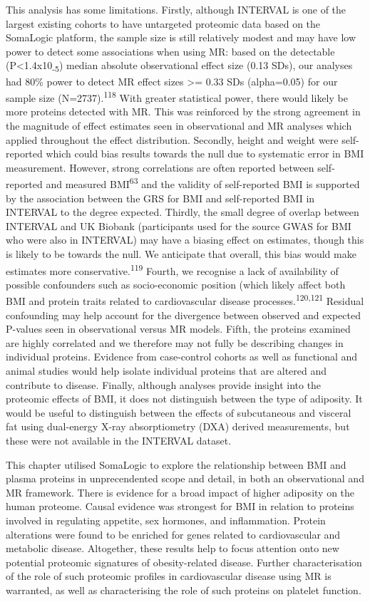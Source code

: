 \documentclass[11pt,twoside]{bristolthesis}
\begin{document}
This analysis has some limitations. Firstly, although INTERVAL is one of the largest existing cohorts to have untargeted proteomic data based on the SomaLogic platform, the sample size is still relatively modest and may have low power to detect some associations when using MR: based on the detectable (P\textless1.4x10\textsubscript{-5}) median absolute observational effect size (0.13 SDs), our analyses had 80\% power to detect MR effect sizes \textgreater= 0.33 SDs (alpha=0.05) for our sample size (N=2737).\textsuperscript{118} With greater statistical power, there would likely be more proteins detected with MR. This was reinforced by the strong agreement in the magnitude of effect estimates seen in observational and MR analyses which applied throughout the effect distribution. Secondly, height and weight were self-reported which could bias results towards the null due to systematic error in BMI measurement. However, strong correlations are often reported between self-reported and measured BMI\textsuperscript{63} and the validity of self-reported BMI is supported by the association between the GRS for BMI and self-reported BMI in INTERVAL to the degree expected. Thirdly, the small degree of overlap between INTERVAL and UK Biobank (participants used for the source GWAS for BMI who were also in INTERVAL) may have a biasing effect on estimates, though this is likely to be towards the null. We anticipate that overall, this bias would make estimates more conservative.\textsuperscript{119} Fourth, we recognise a lack of availability of possible confounders such as socio-economic position (which likely affect both BMI and protein traits related to cardiovascular disease processes.\textsuperscript{120,121} Residual confounding may help account for the divergence between observed and expected P-values seen in observational versus MR models. Fifth, the proteins examined are highly correlated and we therefore may not fully be describing changes in individual proteins. Evidence from case-control cohorts as well as functional and animal studies would help isolate individual proteins that are altered and contribute to disease. Finally, although analyses provide insight into the proteomic effects of BMI, it does not distinguish between the type of adiposity. It would be useful to distinguish between the effects of subcutaneous and visceral fat using dual-energy X-ray absorptiometry (DXA) derived measurements, but these were not available in the INTERVAL dataset.

This chapter utilised SomaLogic to explore the relationship between BMI and plasma proteins in unprecendented scope and detail, in both an observational and MR framework. There is evidence for a broad impact of higher adiposity on the human proteome. Causal evidence was strongest for BMI in relation to proteins involved in regulating appetite, sex hormones, and inflammation. Protein alterations were found to be enriched for genes related to cardiovascular and metabolic disease. Altogether, these results help to focus attention onto new potential proteomic signatures of obesity-related disease. Further characterisation of the role of such proteomic profiles in cardiovascular disease using MR is warranted, as well as characterising the role of such proteins on platelet function.
\end{document}
